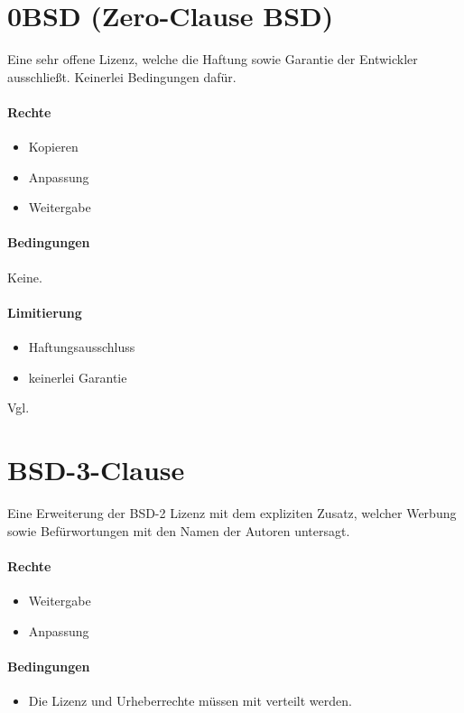 \section{0BSD (Zero-Clause BSD)}\label{sec:0bsd-(zero-clause-bsd)}
Eine sehr offene Lizenz, welche die Haftung sowie Garantie der Entwickler ausschließt.
Keinerlei Bedingungen dafür.

\paragraph{Rechte}
\begin{itemize}
    \item Kopieren
    \item Anpassung
    \item Weitergabe
\end{itemize}
\paragraph{Bedingungen}
Keine.

\paragraph{Limitierung}
\begin{itemize}
    \item Haftungsausschluss
    \item keinerlei Garantie
\end{itemize}

Vgl. \cite{bsd-0-clause}

\section{BSD-3-Clause}\label{sec:bsd-3-clause}
Eine Erweiterung der BSD-2 Lizenz mit dem expliziten Zusatz, welcher Werbung sowie Befürwortungen
mit den Namen der Autoren untersagt.

\paragraph{Rechte}
\begin{itemize}
    \item Weitergabe
    \item Anpassung
\end{itemize}
\paragraph{Bedingungen}
\begin{itemize}
    \item Die Lizenz und Urheberrechte müssen mit verteilt werden.
\end{itemize}


